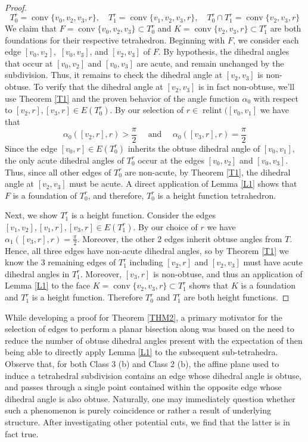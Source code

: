 \documentclass{mainresearch}
\begin{document}
\begin{proof}
	\begin{equation*}
		T_0^r = \operatorname{conv}\{v_0,v_2,v_3,r\}, \quad T_1^r = \operatorname{conv}\{v_1,v_2,v_3,r\}, \quad
		T_0^r \cap T_1^r = \operatorname{conv}\{v_2,v_3,r\}
	\end{equation*}
	We claim that $F=\operatorname{conv} \{v_0,v_2,v_3\} \subset T_0^r$ and $K=\operatorname{conv}\{v_2,v_3,r\}\subset T_1^r$ are both foundations for their respective tetrahedron. Beginning with $F$, we consider each edge $[v_0,v_2],$ $[v_0,v_3]$, and $[v_2,v_3]$ of $F$. By hypothesis, the dihedral angles that occur at $[v_0,v_2]$ and $[v_0,v_3]$ are acute, and remain unchanged by the subdivision. Thus, it remains to check the dihedral angle at $[v_2,v_3]$ is non-obtuse. To verify that the dihedral angle at $[v_2,v_3]$ is in fact non-obtuse, we'll use Theorem \ref{T1} and the proven behavior of the angle function $\alpha_0$ with respect to $[v_2,r],[v_3,r] \in E(T_0^r)$. By our selection of $r \in \operatorname{relint}([v_0,v_1]$ we have that
	\begin{equation*}
		\alpha_0([v_2,r],r)>\frac{\pi}{2} \quad \text{ and } \quad \alpha_0([v_3,r],r) = \frac{\pi}{2}
	\end{equation*}
	Since the edge $[v_0,r] \in E(T_0^r)$ inherits the obtuse dihedral angle of $[v_0,v_1]$, the only acute dihedral angles of $T_0^r$ occur at the edges $[v_0,v_2]$ and $[v_0,v_3]$. Thus, since all other edges of $T_0^r$ are non-acute, by Theorem \ref{T1}, the dihedral angle at $[v_2,v_3]$ must be acute. A direct application of Lemma \ref{L1} shows that $F$ is a foundation of $T_0^r$, and therefore, $T_0^r$ is a height function tetrahedron.
	
	
	Next, we show $T_1^r$ is a height function.  Consider the edges $[v_1,v_2], [v_1,r],[v_3,r]\in E(T_1^r)$. By our choice of $r$ we have $\alpha_1([v_3,r],r) = \frac{\pi}{2}$. Moreover, the other 2 edges inherit obtuse angles from $T$. Hence, all three edges have non-acute dihedral angles, so by Theorem \ref{T1} we know the 3 remaining edges of $T_1^r$ including $[v_2,r]$ and $[v_2,v_3]$ must have acute dihedral angles in $T_1^r$. Moreover, $[v_3,r]$ is non-obtuse, and thus an application of Lemma \ref{L1} to the face $K=\operatorname{conv}\{v_2,v_3,r\}\subset T_1^r$ shows that $K$ is a foundation and $T_1^r$ is a height function. Therefore $T_0^r$ and $T_1^r$ are both height functions.
\end{proof}

While developing a proof for Theorem \ref{THM2}, a primary motivator for the selection of edges to perform a planar bisection along was based on the need to reduce the number of obtuse dihedral angles present with the expectation of then being able to directly apply Lemma \ref{L1} to the subsequent sub-tetrahedra. Observe that, for both Class 3 (b) and Class 2 (b), the affine plane used to induce a tetrahedral subdivision contains an edge whose dihedral angle is obtuse, and passes through a single point contained within the opposite edge whose dihedral angle is also obtuse. Naturally, one may immediately question whether such a phenomenon is purely coincidence or rather a result of underlying structure. After investigating other potential cuts, we find that the latter is in fact true.
\end{document}
